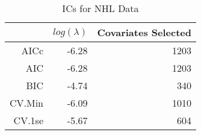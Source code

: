 \begin{table}[ht]
\centering
\begin{tabular}{rrr}
  \hline
 & $log(\lambda)$ & Covariates Selected \\ 
  \hline
AICc & -6.28 & 1203 \\ 
  AIC & -6.28 & 1203 \\ 
  BIC & -4.74 & 340 \\ 
  CV.Min & -6.09 & 1010 \\ 
  CV.1se & -5.67 & 604 \\ 
   \hline
\end{tabular}
\caption{ICs for NHL Data} 
\label{tab:ic}
\end{table}
